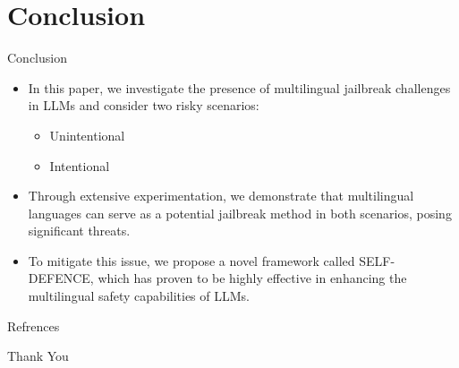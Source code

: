 \section{Conclusion}

\begin{frame}{Conclusion}
    \begin{itemize}
        \item In this paper, we investigate the presence of multilingual jailbreak challenges in LLMs and consider two risky scenarios: 
        \begin{itemize}
            \item Unintentional
            \item Intentional
        \end{itemize}
        \item Through extensive experimentation, we demonstrate that multilingual languages can serve as a potential jailbreak method in both scenarios, posing significant threats.
        \item To mitigate this issue, we propose a novel framework called SELF-DEFENCE, which has proven to be highly effective in enhancing the multilingual safety capabilities of LLMs.
    \end{itemize}
\end{frame}


\begin{frame}{Refrences}
    
    
    \nocite{*}
\end{frame}


\begin{frame}
    \begin{center}
        {\Huge\calligra Thank You}
    \end{center}
\end{frame}